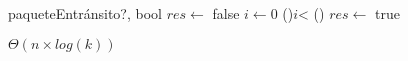 \begin{Algoritmos}
  \begin{algoritmo}{paqueteEntr\'{a}nsito?}{, }{bool}
    $res \gets$ false 
     $i \gets 0$
    \While(){$i$< }{
      \If(){}{
          $res \gets$ true
      }
    }
  \end{algoritmo}
  \datosAlgoritmo{} %
  {} %
  {} %
  {$\Theta(n \times log(k))$} %
  {} %

\end{Algoritmos}

